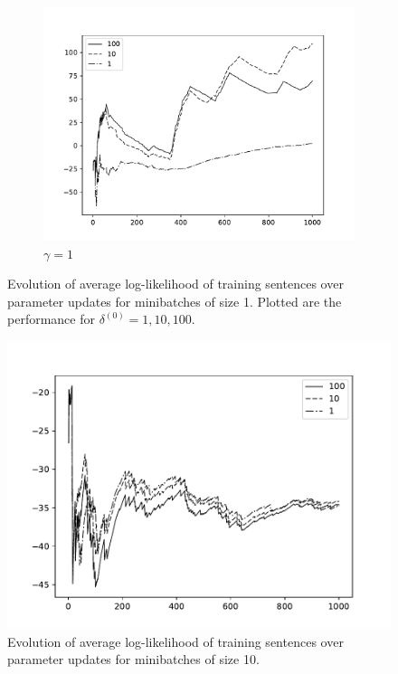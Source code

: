 \documentclass[11pt,a4paper]{article}
\begin{document}
\begin{figure}
\begin{subfigure}{\linewidth}
    \label{fig:gamma01}
\end{subfigure}
\begin{subfigure}{\linewidth}
    \includegraphics[width=\linewidth]{images/likelihoods-lmbda1.pdf}
    \caption{$\gamma = 1$}
    \label{fig:gamma1}
\end{subfigure}
\caption{Evolution of average log-likelihood of training sentences over parameter updates for minibatches of size 1. Plotted are the performance for $\delta^{(0)} = 1, 10, 100$.}
\label{fig:likelihoods-mb1}
\end{figure}

\begin{figure}{\linewidth}
    \includegraphics[width=\linewidth]{images/likelihoods-lmbda1-mb10.pdf}
    \caption{Evolution of average log-likelihood of training sentences over parameter updates for minibatches of size 10.}
    \label{fig:likelihoods-mb10}
\end{figure}
\end{document}
